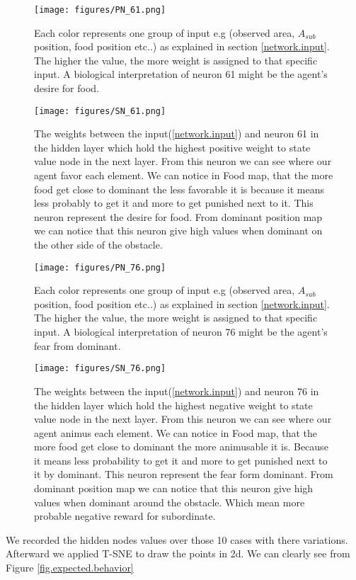\documentclass{article}
\begin{document}
\begin{figure}[H]
\texttt{[image: figures/PN\_61.png]}
\caption{Each color represents one group of input e.g (observed area, \(A_{sub}\) position, food position etc..) as explained in section \ref{network.input}. The higher the value, the more weight is assigned to that specific input. A biological interpretation of neuron 61 might be the agent's desire for food.}
\label{fig.PN_61}
\end{figure}
\begin{figure}[H]
\texttt{[image: figures/SN\_61.png]}
\caption{The weights between the input(\ref{network.input}) and neuron 61 in the hidden layer which hold the highest positive weight to state value node in the next layer. From this neuron we can see where our agent favor each element. We can notice in Food map, that the more food get close to dominant the less favorable it is because it means less probably to get it and more to get punished next to it. This neuron represent the desire for food. From dominant position map we can notice that this neuron give high values when dominant on the other side of the obstacle.}
\label{fig.SN_61}
\end{figure}
\begin{figure}[H]
\texttt{[image: figures/PN\_76.png]}
\caption{Each color represents one group of input e.g (observed area, \(A_{sub}\) position, food position etc..) as explained in section \ref{network.input}. The higher the value, the more weight is assigned to that specific input. A biological interpretation of neuron 76 might be the agent's fear from dominant.}
\label{fig.PN_76}
\end{figure}
\begin{figure}[H]
\texttt{[image: figures/SN\_76.png]}
\caption{The weights between the input(\ref{network.input}) and neuron 76 in the hidden layer which hold the highest negative weight to state value node in the next layer. From this neuron we can see where our agent animus each element. We can notice in Food map, that the more food get close to dominant the more  animusable it is. Because it means less probability to get it and more to get punished next to it by dominant. This neuron represent the fear form dominant. From dominant position map we can notice that this neuron give high values when dominant around the obstacle. Which mean more probable negative reward for subordinate.}
\label{fig.SN_76}
\end{figure}
We recorded the hidden nodes values over those 10 cases with there variations. Afterward we applied T-SNE to draw the points in 2d. We can clearly see from Figure \ref{fig.expected.behavior}
\end{document}
